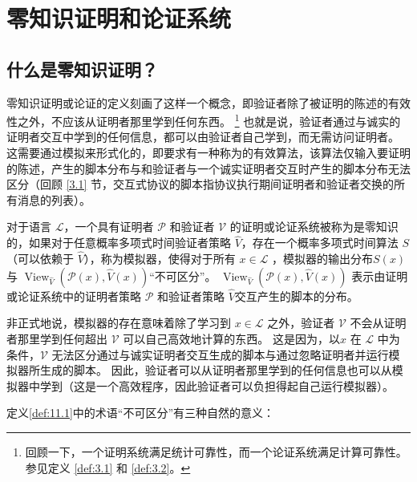 \chapter{零知识证明和论证系统}\label{chp:11ZKP}

\section{什么是零知识证明？}\label{11.1}
零知识证明或论证的定义刻画了这样一个概念，即验证者除了被证明的陈述的有效性之外，不应该从证明者那里学到任何东西。 \footnote{回顾一下，一个证明系统满足统计可靠性，而一个论证系统满足计算可靠性。 参见定义 \ref{def:3.1} 和 \ref{def:3.2}。} 
也就是说，验证者通过与诚实的证明者交互中学到的任何信息，都可以由验证者自己学到，而无需访问证明者。 
这需要通过模拟来形式化的，即要求有一种称为的有效算法，该算法仅输入要证明的陈述，产生的脚本分布与和验证者与一个诚实证明者交互时产生的脚本分布无法区分（回顾 \ref{3.1} 节，交互式协议的脚本指协议执行期间证明者和验证者交换的所有消息的列表）。

\begin{definition}[零知识的非正式定义] \label{def:11.1}
    对于语言 $\mathcal{L}$，一个具有证明者 $\mathcal{P}$ 和验证者 $\mathcal{V}$ 的证明或论证系统被称为是零知识的，如果对于任意概率多项式时间验证者策略 $\hat{V}$，存在一个概率多项式时间算法 $S$（可以依赖于 $\hat{V}$），称为模拟器，使得对于所有 $x \in \mathcal{L}$ ，模拟器的输出分布$S(x)$ 与 $\operatorname{View}_{\hat{V}}(\mathcal{P}(x), \hat{V}( x))$“不可区分”。 $\operatorname{View}_{\hat{V}}(\mathcal{P}(x), \hat{V}(x))$ 表示由证明或论证系统中的证明者策略 $\mathcal{P}$ 和验证者策略 $\hat{V}$交互产生的脚本的分布。
\end{definition}

非正式地说，模拟器的存在意味着除了学习到 $x \in \mathcal{L}$ 之外，验证者 $\mathcal{V}$ 不会从证明者那里学到任何超出 $\mathcal{V}$ 可以自己高效地计算的东西。 
这是因为，以$x$ 在 $\mathcal{L}$ 中为条件，$\mathcal{V}$ 无法区分通过与诚实证明者交互生成的脚本与通过忽略证明者并运行模拟器所生成的脚本。 
因此，验证者可以从证明者那里学到的任何信息也可以从模拟器中学到（这是一个高效程序，因此验证者可以负担得起自己运行模拟器）。

定义\ref{def:11.1}中的术语“不可区分”有三种自然的意义：

